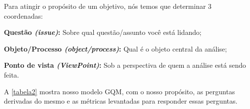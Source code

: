 Para atingir o propósito de um objetivo, nós temos que determinar 3 coordenadas:

\begin{alineas}
	\item \textbf{Questão \textit{(issue)}:} Sobre qual questão/assunto você está lidando;
	\item \textbf{Objeto/Processo \textit{(object/process)}:} Qual é o objeto central da análise;
	\item \textbf{Ponto de vista \textit{(ViewPoint)}:} Sob a perspectiva de quem a análise está sendo feita.
\end{alineas}
	
A \autoref{tabela2} mostra nosso modelo GQM, com o nosso propósito, as perguntas derivadas do mesmo e as métricas levantadas para responder essas perguntas.



